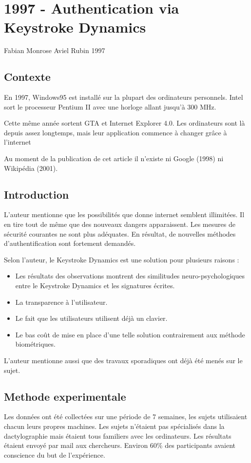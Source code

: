 \section{1997 - Authentication via Keystroke Dynamics}
Fabian Monrose
Aviel Rubin
1997

\subsection{Contexte}
En 1997, Windows95 est installé sur la plupart des ordinateurs personnels. Intel sort le processeur Pentium II avec une horloge allant jusqu’à 300 MHz.

Cette même année sortent GTA et Internet Explorer 4.0. Les ordinateurs sont là depuis assez longtemps, mais leur application commence à changer grâce à l’internet

Au moment de la publication de cet article il n’existe ni Google (1998) ni Wikipédia (2001).

\subsection{Introduction}
L’auteur mentionne que les possibilités que donne internet semblent illimitées. Il en tire tout de même que des nouveaux dangers apparaissent. Les mesures de sécurité courantes ne sont plus adéquates. En résultat, de nouvelles méthodes d’authentification sont fortement demandés.

Selon l’auteur, le Keystroke Dynamics est une solution pour plusieurs raisons :
\begin{itemize}
\item Les résultats des observations montrent des similitudes neuro-psychologiques entre le Keystroke Dynamics et les signatures écrites.
\item La transparence à l’utilisateur.
\item Le fait que les utilisateurs utilisent déjà un clavier.
\item Le bas coût de mise en place d’une telle solution contrairement aux méthode biométriques.
\end{itemize}

L’auteur mentionne aussi que des travaux sporadiques ont déjà été menés sur le sujet.

\subsection{Methode experimentale}
Les données ont été collectées sur une période de 7 semaines, les sujets utilisaient chacun leurs propres machines. Les sujets n’étaient pas spécialisés dans la dactylographie mais étaient tous familiers avec les ordinateurs. Les résultats étaient envoyé par mail aux chercheurs. Environ 60\% des participants avaient conscience du but de l’expérience.

